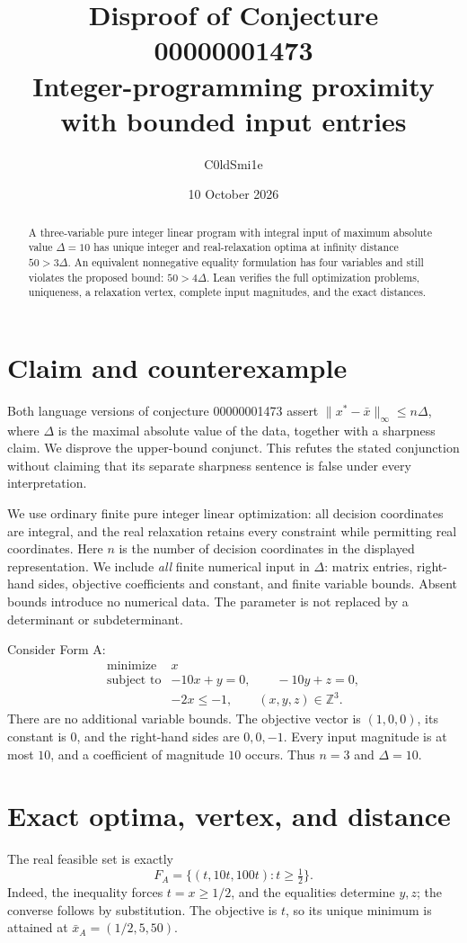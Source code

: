 \documentclass[10pt]{article}
\title{Disproof of Conjecture 00000001473\\\large Integer-programming proximity with bounded input entries}
\author{C0ldSmi1e}
\date{10 October 2026}
\begin{document}
\maketitle
\begin{abstract}
A three-variable pure integer linear program with integral input of maximum absolute value $\Delta=10$ has unique integer and real-relaxation optima at infinity distance $50>3\Delta$. An equivalent nonnegative equality formulation has four variables and still violates the proposed bound: $50>4\Delta$. Lean verifies the full optimization problems, uniqueness, a relaxation vertex, complete input magnitudes, and the exact distances.
\end{abstract}

\section{Claim and counterexample}
Both language versions of conjecture 00000001473 assert
$\|x^*-\bar x\|_\infty\le n\Delta$, where $\Delta$ is the maximal absolute value of the data, together with a sharpness claim. We disprove the upper-bound conjunct. This refutes the stated conjunction without claiming that its separate sharpness sentence is false under every interpretation.

We use ordinary finite pure integer linear optimization: all decision coordinates are integral, and the real relaxation retains every constraint while permitting real coordinates. Here $n$ is the number of decision coordinates in the displayed representation. We include \emph{all} finite numerical input in $\Delta$: matrix entries, right-hand sides, objective coefficients and constant, and finite variable bounds. Absent bounds introduce no numerical data. The parameter is not replaced by a determinant or subdeterminant.

Consider Form A:
\[
\begin{array}{ll}
\text{minimize} & x\\[2pt]
\text{subject to} & -10x+y=0,\qquad -10y+z=0,\\
                 & -2x\le-1,\qquad (x,y,z)\in\mathbb Z^3.
\end{array}
\]
There are no additional variable bounds. The objective vector is $(1,0,0)$, its constant is $0$, and the right-hand sides are $0,0,-1$. Every input magnitude is at most $10$, and a coefficient of magnitude $10$ occurs. Thus $n=3$ and $\Delta=10$.

\section{Exact optima, vertex, and distance}
The real feasible set is exactly
\[
 F_A=\{(t,10t,100t):t\ge\tfrac12\}.
\]
Indeed, the inequality forces $t=x\ge1/2$, and the equalities determine $y,z$; the converse follows by substitution. The objective is $t$, so its unique minimum is attained at $\bar x_A=(1/2,5,50)$.
\end{document}
